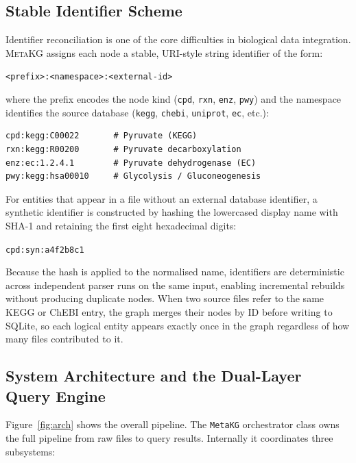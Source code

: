 \documentclass[10pt]{article}
\begin{document}
\subsection{Stable Identifier Scheme}

Identifier reconciliation is one of the core difficulties in biological data
integration. \textsc{MetaKG} assigns each node a stable, URI-style string
identifier of the form:

\begin{center}
\texttt{<prefix>:<namespace>:<external-id>}
\end{center}

\noindent where the prefix encodes the node kind (\texttt{cpd}, \texttt{rxn},
\texttt{enz}, \texttt{pwy}) and the namespace identifies the source database
(\texttt{kegg}, \texttt{chebi}, \texttt{uniprot}, \texttt{ec}, etc.):

\begin{lstlisting}[style=python, caption={Examples of stable node identifiers.}]
cpd:kegg:C00022       # Pyruvate (KEGG)
rxn:kegg:R00200       # Pyruvate decarboxylation
enz:ec:1.2.4.1        # Pyruvate dehydrogenase (EC)
pwy:kegg:hsa00010     # Glycolysis / Gluconeogenesis
\end{lstlisting}

For entities that appear in a file without an external database identifier,
a synthetic identifier is constructed by hashing the lowercased display name
with SHA-1 and retaining the first eight hexadecimal digits:

\begin{center}
\texttt{cpd:syn:a4f2b8c1}
\end{center}

Because the hash is applied to the normalised name, identifiers are
deterministic across independent parser runs on the same input, enabling
incremental rebuilds without producing duplicate nodes. When two source files
refer to the same KEGG or ChEBI entry, the graph merges their nodes by ID
before writing to SQLite, so each logical entity appears exactly once in the
graph regardless of how many files contributed to it.

\subsection{System Architecture and the Dual-Layer Query Engine}

Figure~\ref{fig:arch} shows the overall pipeline. The \texttt{MetaKG}
orchestrator class owns the full pipeline from raw files to query results.
Internally it coordinates three subsystems:
\end{document}
